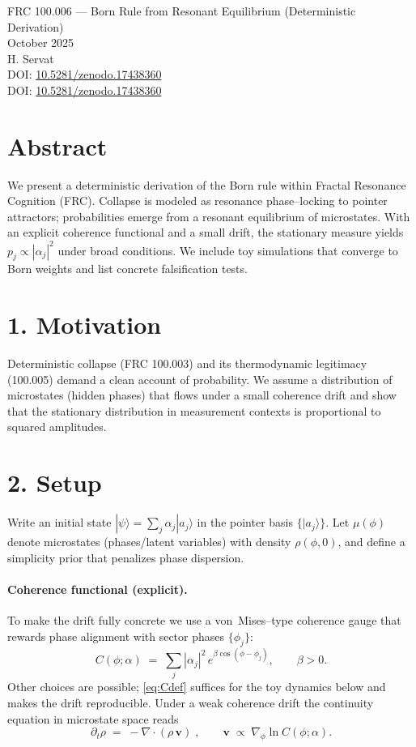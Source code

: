 \documentclass[10pt]{article}
\begin{document}
\begin{center}
{\Large FRC 100.006 — Born Rule from Resonant Equilibrium (Deterministic Derivation)}\\
{\large October 2025}\\[4pt]
H. Servat
\\[4pt]
\small DOI: \href{https://doi.org/10.5281/zenodo.17438360}{10.5281/zenodo.17438360}
\\[4pt]
\small DOI: \href{https://doi.org/10.5281/zenodo.17438360}{10.5281/zenodo.17438360}
\end{center}

\section*{Abstract}
We present a deterministic derivation of the Born rule within Fractal Resonance Cognition (FRC). Collapse is modeled as resonance phase--locking to pointer attractors; probabilities emerge from a resonant equilibrium of microstates. With an explicit coherence functional and a small drift, the stationary measure yields $p_j\!\propto\!|\alpha_j|^2$ under broad conditions. We include toy simulations that converge to Born weights and list concrete falsification tests.

\section*{1. Motivation}
Deterministic collapse (FRC 100.003) and its thermodynamic legitimacy (100.005) demand a clean account of probability. We assume a distribution of microstates (hidden phases) that flows under a small coherence drift and show that the stationary distribution in measurement contexts is proportional to squared amplitudes.

\section*{2. Setup}
Write an initial state $|\psi\rangle=\sum_j \alpha_j |a_j\rangle$ in the pointer basis $\{|a_j\rangle\}$. Let $\mu(\phi)$ denote microstates (phases/latent variables) with density $\rho(\phi,0)$, and define a simplicity prior that penalizes phase dispersion.

\paragraph{Coherence functional (explicit).}
To make the drift fully concrete we use a von~Mises--type coherence gauge that rewards phase alignment with sector phases $\{\phi_j\}$:
\begin{equation}
 C(\phi;\alpha) \;=\; \sum_{j} |\alpha_j|^2\, e^{\beta\cos(\phi-\phi_j)} ,\qquad \beta>0.\label{eq:Cdef}
\end{equation}
Other choices are possible; \eqref{eq:Cdef} suffices for the toy dynamics below and makes the drift reproducible. Under a weak coherence drift the continuity equation in microstate space reads
\begin{equation}
 \partial_t \rho \;=\; -\nabla\!\cdot (\rho\,\mathbf{v})\; ,\qquad \mathbf{v} \;\propto\; \nabla_{\phi} \ln C(\phi;\alpha).\label{eq:continuity}
\end{equation}
\end{document}
